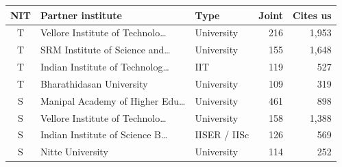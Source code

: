 \begin{tabular}{@{}clp{1.65cm}rr@{}}
\toprule
NIT & Partner institute & Type & Joint & Cites us \\
\midrule
T & Vellore Institute of Technolo\ldots{} & University &216 & 1{,}953 \\
T & SRM Institute of Science and\ldots{} & University &155 & 1{,}648 \\
T & Indian Institute of Technolog\ldots{} & IIT &119 & 527 \\
T & Bharathidasan University & University &109 & 319 \\
S & Manipal Academy of Higher Edu\ldots{} & University &461 & 898 \\
S & Vellore Institute of Technolo\ldots{} & University &158 & 1{,}388 \\
S & Indian Institute of Science B\ldots{} & IISER / IISc &126 & 569 \\
S & Nitte University & University &114 & 252 \\
\bottomrule
\end{tabular}
